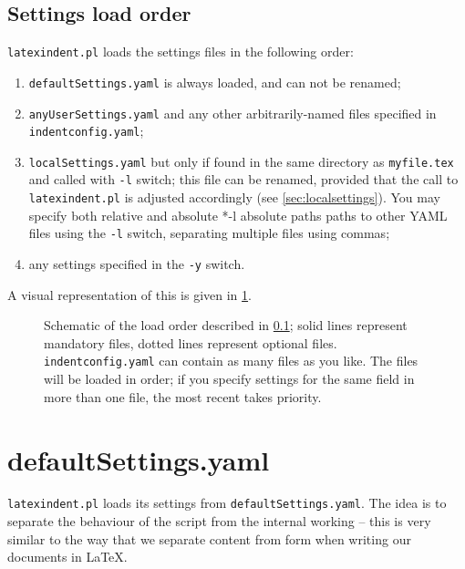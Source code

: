 \documentclass[10pt]{article}
\begin{document}
\subsection{Settings load order}\label{sec:loadorder}
 \texttt{latexindent.pl} loads the settings files in the following order:
 \begin{enumerate}
  \item \texttt{defaultSettings.yaml} is always loaded, and can not be renamed;
  \item \texttt{anyUserSettings.yaml} and any other arbitrarily-named files specified in
        \texttt{indentconfig.yaml};
  \item \texttt{localSettings.yaml} but only if found in the same directory as
        \texttt{myfile.tex}
        and called with \texttt{-l} switch; this file can be renamed, provided that the call to
        \texttt{latexindent.pl} is adjusted accordingly (see \cref{sec:localsettings}). You may
        specify both relative and absolute%
        *{-l absolute paths} paths to other YAML files using the \texttt{-l}
        switch, separating multiple files using commas;
  \item any settings  specified in the
        \texttt{-y} switch.%
 \end{enumerate}
 A visual representation of this is given in \cref{fig:loadorder}.

 \begin{figure}[!htb]
  \centering
  
  \caption{Schematic of the load order described in \cref{sec:loadorder}; solid lines represent
  mandatory files, dotted lines represent optional files. \texttt{indentconfig.yaml} can
  contain as many files as you like. The files will be loaded in order; if you specify
  settings for the same field in more than one file, the most recent takes priority. }
  \label{fig:loadorder}
 \end{figure}
\section{defaultSettings.yaml}\label{sec:defuseloc}
 \texttt{latexindent.pl} loads its settings from \texttt{defaultSettings.yaml}. The idea
 is to separate the behaviour of the script from the internal working -- this is very
 similar to the way that we separate content from form when writing our documents in
 \LaTeX.
\end{document}
